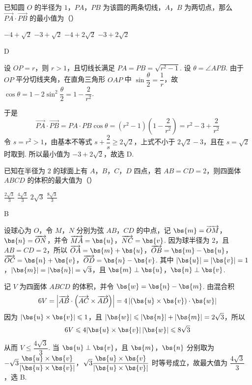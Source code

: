 \begin{problem}
已知圆 \(O\) 的半径为 \(1\)，\(PA\)，\(PB\) 为该圆的两条切线，\(A\)，\(B\) 为两切点，那么 \(\overrightarrow{PA} \cdot \overrightarrow{PB}\) 的最小值为（\quad）

\choices
    {\(-4 + \sqrt{2}\)}
    {\(-3 + \sqrt{2}\)}
    {\(-4 + 2\sqrt{2}\)}
    {\(-3 + 2\sqrt{2}\)}
\end{problem}

\begin{answer}
D
\end{answer}

\begin{solution}
设 \(OP=r\)，则 \(r>1\)，且切线长满足
\(PA=PB=\sqrt{r^2-1}\). 设 \(\theta=\angle APB\). 由于 \(OP\) 平分切线夹角，在直角三角形 \(OAP\) 中
\(\sin\dfrac{\theta}{2}=\dfrac1r\)，故
\(\cos\theta=1-2\sin^2\dfrac{\theta}{2}=1-\dfrac2{r^2}\).

于是
\[
\overrightarrow{PA}\cdot\overrightarrow{PB}=PA\cdot PB\cos\theta
=(r^2-1)\left(1-\frac2{r^2}\right)=r^2-3+\frac2{r^2}
\]
令 \(s=r^2>1\)，由基本不等式 \(s+\dfrac2s\geqslant2\sqrt2\)，上式不小于 \(2\sqrt2-3\)，且在 \(s=\sqrt2\) 时取到. 所以最小值为 \(-3+2\sqrt2\)，故选 D.
\end{solution}

\begin{problem}
已知在半径为 \(2\) 的球面上有 \(A\)，\(B\)，\(C\)，\(D\) 四点，若 \(AB = CD = 2\)，则四面体 \(ABCD\) 的体积的最大值为（\quad）

\choices
    {\(\frac{2\sqrt{3}}{3}\)}
    {\(\frac{4\sqrt{3}}{3}\)}
    {\(2\sqrt{3}\)}
    {\(\frac{8\sqrt{3}}{3}\)}
\end{problem}

\begin{answer}
B
\end{answer}

\begin{solution}
设球心为 \(O\)，令 \(M\)，\(N\) 分别为弦 \(AB\)，\(CD\) 的中点，记 \(\bs{m}=\overrightarrow{OM}\)，\(\bs{n}=\overrightarrow{ON}\)，并令 \(\overrightarrow{MA}=\bs{u}\)，\(\overrightarrow{NC}=\bs{v}\). 因为球半径为 \(2\)，且 \(AB=CD=2\)，所以 \(\overrightarrow{OA}=\bs{m}+\bs{u}\)，\(\overrightarrow{OB}=\bs{m}-\bs{u}\)，\(\overrightarrow{OC}=\bs{n}+\bs{v}\)，\(\overrightarrow{OD}=\bs{n}-\bs{v}\).
其中 \(|\bs{u}|=|\bs{v}|=1\)，\(|\bs{m}|=|\bs{n}|=\sqrt3\)，且 \(\bs{m}\perp\bs{u}\)，\(\bs{n}\perp\bs{v}\).

记 \(V\) 为四面体 \(ABCD\) 的体积，并令 \(\bs{w}=\bs{n}-\bs{m}\). 由混合积
\[
6V=\left|\overrightarrow{AB}\cdot\left(\overrightarrow{AC}\times\overrightarrow{AD}\right)\right|
=4\left|\left(\bs{u}\times\bs{v}\right)\cdot\bs{w}\right|
\]
因为 \(|\bs{u}\times\bs{v}|\leqslant1\)，且 \(|\bs{w}|\leqslant|\bs{n}|+|\bs{m}|=2\sqrt3\)，所以
\[
6V\leqslant4|\bs{u}\times\bs{v}|\,|\bs{w}|
\leqslant8\sqrt3
\]
从而 \(V\leqslant\dfrac{4\sqrt3}{3}\). 当 \(\bs{u}\perp\bs{v}\)，且 \(\bs{m}\)，\(\bs{n}\) 分别取为 \( -\sqrt3\dfrac{\bs{u}\times\bs{v}}{|\bs{u}\times\bs{v}|}\)，\(\sqrt3\dfrac{\bs{u}\times\bs{v}}{|\bs{u}\times\bs{v}|}\) 时等号成立，故最大值为 \(\dfrac{4\sqrt3}{3}\)，选 B.
\end{solution}

